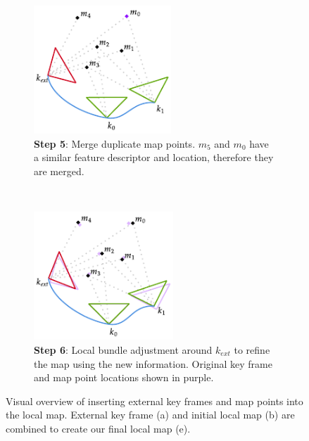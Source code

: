 \begin{figure}[h]
\begin{subfigure}[t]{0.333\textwidth}
    \end{subfigure}%
    ~
    \begin{subfigure}[t]{0.333\textwidth}
        \centering
        \includegraphics[height=1.9in]{figures/external_key_frame_insertion_4.pdf}
        \caption{\textbf{Step 5}: Merge duplicate map points. $m_5$ and $m_0$ have a similar feature descriptor and location, therefore they are merged.}
    \end{subfigure}%
    ~
    \begin{subfigure}[t]{0.333\textwidth}
        \centering
        \includegraphics[height=1.9in]{figures/external_key_frame_insertion_5.pdf}
        \caption{\textbf{Step 6}: Local bundle adjustment around $k_{ext}$ to refine the map using the new information. Original key frame and map point locations shown in purple.}
    \end{subfigure}%

    \caption{Visual overview of inserting external key frames and map points into the local map. External key frame (a) and initial local map (b) are combined to create our final local map (e).}

\end{figure}

